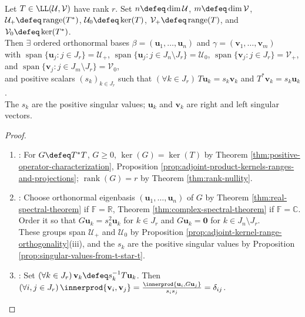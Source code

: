 \begin{theorem} \label{thm:rectangular-operator-singular-vector-decomposition} \\
Let $T\in\LL(\mathcal{U},\mathcal{V})$ have rank $r$. Set $n\defeq\dim\mathcal{U}$, $m\defeq\dim\mathcal{V}$, $\mathcal{U}_+\defeq\operatorname{range}(T^*)$, $\mathcal{U}_0\defeq\ker(T)$, $\mathcal{V}_+\defeq\operatorname{range}(T)$, and $\mathcal{V}_0\defeq\ker(T^*)$.\\
Then $\exists$ ordered orthonormal bases $\beta=(\mathbf{u}_1,\ldots,\mathbf{u}_n)$ and $\gamma=(\mathbf{v}_1,\ldots,\mathbf{v}_m)$\\
with $\operatorname{span}\{\mathbf{u}_j:j\in J_r\}=\mathcal{U}_+$, $\operatorname{span}\{\mathbf{u}_j:j\in J_n\setminus J_r\}=\mathcal{U}_0$, $\operatorname{span}\{\mathbf{v}_j:j\in J_r\}=\mathcal{V}_+$, and $\operatorname{span}\{\mathbf{v}_j:j\in J_m\setminus J_r\}=\mathcal{V}_0$,\\
and positive scalars $(s_k)_{k\in J_r}$ such that $(\forall k\in J_r)\,T\mathbf{u}_k=s_k\mathbf{v}_k$ and $T^*\mathbf{v}_k=s_k\mathbf{u}_k$.\\
The $s_k$ are the positive singular values; $\mathbf{u}_k$ and $\mathbf{v}_k$ are right and left singular vectors.
\begin{proof}
\begin{enumerate}[label=(\roman*)]
\setlength{\itemsep}{0pt}
\item {}: For $G\defeq T^*T$, $G\geq0$, $\ker(G)=\ker(T)$ by Theorem \ref{thm:positive-operator-characterization}, Proposition \ref{prop:adjoint-product-kernels-ranges-and-projections}; $\operatorname{rank}(G)=r$ by Theorem \ref{thm:rank-nullity}.
\item {}: Choose orthonormal eigenbasis $(\mathbf{u}_1,\ldots,\mathbf{u}_n)$ of $G$ by Theorem \ref{thm:real-spectral-theorem} if $\mathbb{F}=\mathbb{R}$, Theorem \ref{thm:complex-spectral-theorem} if $\mathbb{F}=\mathbb{C}$.\\
Order it so that $G\mathbf{u}_k=s_k^2\mathbf{u}_k$ for $k\in J_r$ and $G\mathbf{u}_k=\mathbf{0}$ for $k\in J_n\setminus J_r$.\\
These groups span $\mathcal{U}_+$ and $\mathcal{U}_0$ by Proposition \ref{prop:adjoint-kernel-range-orthogonality}(iii), and the $s_k$ are the positive singular values by Proposition \ref{prop:singular-values-from-t-star-t}.
\item {}: Set $(\forall k\in J_r)\,\mathbf{v}_k\defeq s_k^{-1}T\mathbf{u}_k$. Then $(\forall i,j\in J_r)\,\innerprod{\mathbf{v}_i,\mathbf{v}_j}=\frac{\innerprod{\mathbf{u}_i,G\mathbf{u}_j}}{s_is_j}=\delta_{ij}$.\\

\end{enumerate}
\end{proof}
\end{theorem}
